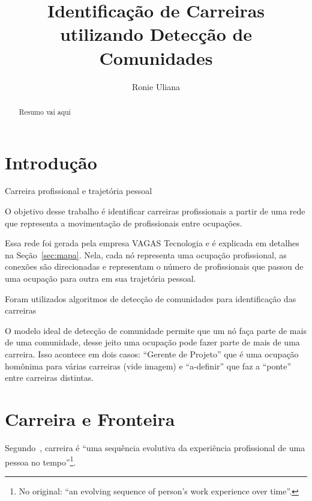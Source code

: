 \documentclass[
  article,
  11pt,
  a4paper,
  english,
  brazil,
  sumario=tradicional]{abntex2}
\title{Identificação de Carreiras utilizando Detecção de Comunidades}
\author{Ronie Uliana}
\begin{document}

\frenchspacing

\maketitle

\begin{abstract}
Resumo vai aqui
\end{abstract}

\section{Introdução}

Carreira profissional e trajetória pessoal

O objetivo desse trabalho é identificar carreiras profissionais a partir de uma rede que representa a movimentação de profissionais entre ocupações.

Essa rede foi gerada pela empresa VAGAS Tecnologia e é explicada em detalhes na Seção~\ref{sec:mapa}. Nela, cada nó representa uma ocupação profissional, as conexões são direcionadas e representam o número de profissionais que passou de uma ocupação para outra em sua trajetória pessoal.



Foram utilizados algoritmos de detecção de comunidades para identificação das carreiras

O modelo ideal de detecção de comunidade permite que um nó faça parte de mais de uma comunidade, desse jeito uma ocupação pode fazer parte de mais de uma carreira. Isso acontece em dois casos: \enquote{Gerente de Projeto} que é uma ocupação homônima para várias carreiras (vide imagem) e \enquote{a-definir} que faz a \enquote{ponte} entre carreiras distintas.

\section{Carreira e Fronteira} \label{sec:carreira}

Segundo~, carreira é \foreignquote{english}{uma sequência evolutiva da experiência profissional de uma pessoa no tempo}\footnote{No original: \enquote{an evolving sequence of person's work experience over time}.}.
\end{document}
